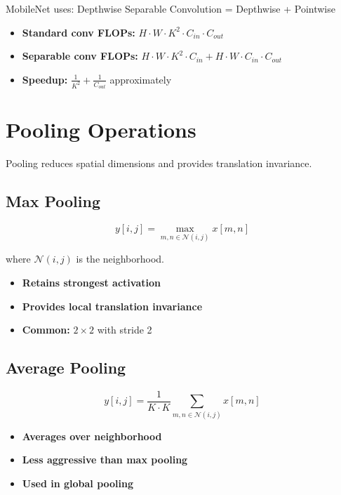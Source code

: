 MobileNet uses: Depthwise Separable Convolution = Depthwise + Pointwise

\begin{properties}
\begin{itemize}
    \item \textbf{Standard conv FLOPs:} $H \cdot W \cdot K^2 \cdot C_{in} \cdot C_{out}$
    \item \textbf{Separable conv FLOPs:} $H \cdot W \cdot K^2 \cdot C_{in} + H \cdot W \cdot C_{in} \cdot C_{out}$
    \item \textbf{Speedup:} $\frac{1}{K^2} + \frac{1}{C_{out}}$ approximately
\end{itemize}
\end{properties}

\section{Pooling Operations}

Pooling reduces spatial dimensions and provides translation invariance.

\subsection{Max Pooling}

\begin{equation}
y[i,j] = \max_{m,n \in \mathcal{N}(i,j)} x[m,n]
\end{equation}

where $\mathcal{N}(i,j)$ is the neighborhood.

\begin{itemize}
    \item \textbf{Retains strongest activation}
    \item \textbf{Provides local translation invariance}
    \item \textbf{Common: } $2\times2$ with stride 2
\end{itemize}

\subsection{Average Pooling}

\begin{equation}
y[i,j] = \frac{1}{K \cdot K}\sum_{m,n \in \mathcal{N}(i,j)} x[m,n]
\end{equation}

\begin{itemize}
    \item \textbf{Averages over neighborhood}
    \item \textbf{Less aggressive than max pooling}
    \item \textbf{Used in global pooling}
\end{itemize}

